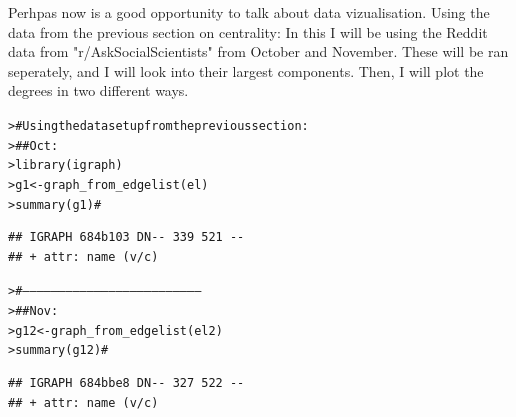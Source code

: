 \documentclass[12pt]{article}\usepackage[]{graphicx}\usepackage[]{color}
\makeatletter
\newcommand{\hlcom}[1]{\textcolor[rgb]{0.404,0.408,0.42}{#1}}%
\newcommand{\hlstd}[1]{\textcolor[rgb]{0.882,0.878,0.898}{#1}}%
\newcommand{\hlkwb}[1]{\textcolor[rgb]{0.902,0.675,0.196}{#1}}%
\newcommand{\hlkwd}[1]{\textcolor[rgb]{0.733,0.388,0.812}{#1}}%
\newenvironment{kframe}{%
 \def\at@end@of@kframe{}%
 \ifinner\ifhmode%
  \def\at@end@of@kframe{\end{minipage}}%
  \begin{minipage}{\columnwidth}%
 \fi\fi%
 \def\FrameCommand##1{\hskip\@totalleftmargin \hskip-\fboxsep
 \colorbox{shadecolor}{##1}\hskip-\fboxsep
     \hskip-\linewidth \hskip-\@totalleftmargin \hskip\columnwidth}%
 \MakeFramed {\advance\hsize-\width
   \@totalleftmargin\z@ \linewidth\hsize
   \@setminipage}}%
 {\par\unskip\endMakeFramed%
 \at@end@of@kframe}
\newenvironment{knitrout}{}{} %
\makeatother
\begin{document}
\begin{flushleft}
Perhpas now is a good opportunity to talk about data vizualisation. Using the data from the previous section on centrality:
In this I will be using the Reddit data from "r/AskSocialScientists" from October and November. These will be ran seperately, and I will look into their largest components. Then, I will plot the degrees in two different ways.

\begin{knitrout}
\color{fgcolor}\begin{kframe}
\begin{alltt}
\hlstd{> }\hlcom{# Using the data set up from the previous section:}
\hlstd{> }\hlcom{##    Oct:}
\hlstd{> }\hlkwd{library}\hlstd{(igraph)}
\hlstd{> }\hlstd{g1} \hlkwb{<-} \hlkwd{graph_from_edgelist}\hlstd{(el)}
\hlstd{> }\hlkwd{summary}\hlstd{(g1)} \hlcom{#}
\end{alltt}
\begin{verbatim}
## IGRAPH 684b103 DN-- 339 521 -- 
## + attr: name (v/c)
\end{verbatim}
\begin{alltt}
\hlstd{> }\hlcom{#---------------------------------------------------------------------------}
\hlstd{> }\hlcom{##   Nov:}
\hlstd{> }\hlstd{g12} \hlkwb{<-} \hlkwd{graph_from_edgelist}\hlstd{(el2)}
\hlstd{> }\hlkwd{summary}\hlstd{(g12)} \hlcom{#}
\end{alltt}
\begin{verbatim}
## IGRAPH 684bbe8 DN-- 327 522 -- 
## + attr: name (v/c)
\end{verbatim}
\end{kframe}
\end{knitrout}


\end{flushleft}
\end{document}
